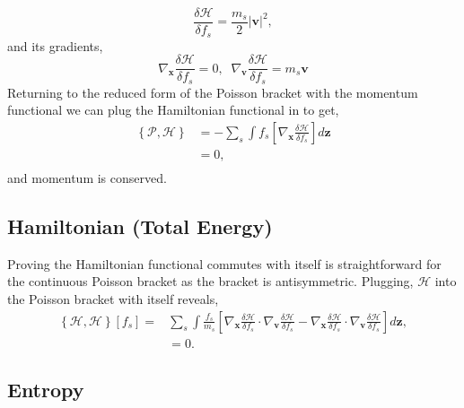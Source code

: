 \documentclass[preprint,12pt]{elsarticle}
\theoremstyle{definition}
\begin{document}
\begin{equation*}
  \frac{\delta \mathcal{H}}{\delta f_s} = \frac{m_s}{2} |\boldsymbol{v}|^2,
\end{equation*}
and its gradients,
\begin{equation*}
  \nabla_{\boldsymbol{x}} \frac{\delta \mathcal{H}}{\delta f_s} = 0,\;\;\nabla_{\boldsymbol{v}} \frac{\delta \mathcal{H}}{\delta f_s} = m_s \boldsymbol{v}
\end{equation*}
Returning to the reduced form of the Poisson bracket with the momentum functional we can plug the Hamiltonian functional in to get,
\begin{align*}
  \left\{\mathcal{P},\mathcal{H}\right\} &= -\sum_s \int f_s \left[\nabla_{\boldsymbol{x}} \frac{\delta \mathcal{H}}{\delta f_s} \right] d\boldsymbol{z}\\
  &= 0,\\
\end{align*}
and momentum is conserved.

\subsection{Hamiltonian (Total Energy)}

Proving the Hamiltonian functional commutes with itself is straightforward for the continuous Poisson bracket as the bracket is antisymmetric. Plugging, $\mathcal{H}$ into the Poisson bracket with itself reveals,
\begin{align*}
  \left\{\mathcal{H},\mathcal{H}\right\} \left[f_s\right] = &\sum_s \int \frac{f_s}{m_s} \left[\nabla_{\boldsymbol{x}} \frac{\delta \mathcal{H}}{\delta f_s} \cdot \nabla_{\boldsymbol{v}} \frac{\delta \mathcal{H}}{\delta f_s} - \nabla_{\boldsymbol{x}} \frac{\delta \mathcal{H}}{\delta f_s} \cdot \nabla_{\boldsymbol{v}} \frac{\delta \mathcal{H}}{\delta f_s} \right] d\boldsymbol{z},\\
  &= 0.
\end{align*}

\subsection{Entropy}
\end{document}
